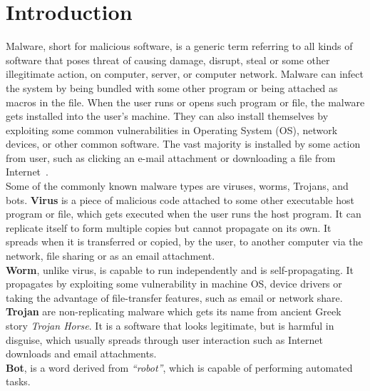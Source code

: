 \chapter{Introduction}\label{chapter:introduction}
Malware, short for malicious software, is a generic term referring to all kinds of software that poses threat of causing damage, disrupt, steal or some other illegitimate action, on computer, server, or computer network.
Malware can infect the system by being bundled with some other program or being attached as macros in the file.
When the user runs or opens such program or file, the malware gets installed into the user's machine.
They can also install themselves by exploiting some common vulnerabilities in Operating System (OS), network devices, or other common software.
The vast majority is installed by some action from user, such as clicking an e-mail attachment or downloading a file from Internet~\cite[]{ciscodif}.\\
Some of the commonly known malware types are viruses, worms, Trojans, and bots.
\textbf{Virus} is a piece of malicious code attached to some other executable host program or file, which gets executed when the user runs the host program.
It can replicate itself to form multiple copies but cannot propagate on its own.
It spreads when it is transferred or copied, by the user, to another computer via the network, file sharing or as an email attachment.\\
\textbf{Worm}, unlike virus, is capable to run independently and is self-propagating.
It propagates by exploiting some vulnerability in machine OS, device drivers or taking the advantage of file-transfer features, such as email or network share.\\
\textbf{Trojan} are non-replicating malware which gets its name from ancient Greek story \textit{Trojan Horse}.
It is a software that looks legitimate, but is harmful in disguise, which usually spreads through user interaction such as Internet downloads and email attachments.\\
\textbf{Bot}, is a word derived from \emph{``robot''}, which is capable of performing automated tasks.

